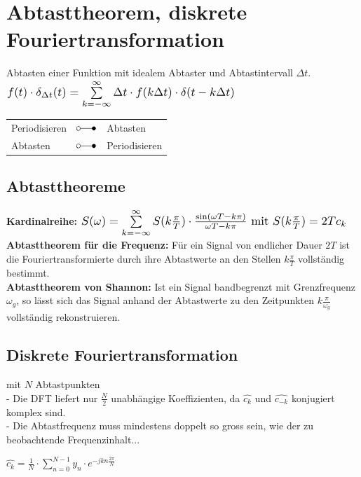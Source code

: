 
\section{Abtasttheorem, diskrete Fouriertransformation}
	\begin{minipage}{12cm}
		Abtasten einer Funktion mit idealem Abtaster und Abtastintervall $\Delta t$.\\
		$ \scalebox{1.2}{$f(t) \cdot \delta_{\Delta t}(t) = \sum\limits_{k=-\infty}^{\infty} \Delta t \cdot f(k \Delta t) \cdot \delta(t-k \Delta t) $}$
	\end{minipage}
	\begin{minipage}{6cm}
		\begin{tabular}{|l l l|}
			\hline
				Periodisieren &$\laplace$ & Abtasten\\
				Abtasten & $\laplace$ & Periodisieren\\
			\hline
		\end{tabular}
	\end{minipage}

\subsection{Abtasttheoreme}
	\textbf{Kardinalreihe:}  $\scalebox{1.2}{$S(\omega) = \sum\limits_{k=-\infty}^{\infty} S(k\frac{\pi}{T}) \cdot \frac{\sin(\omega T - k\pi)}{\omega T - k\pi}$
	mit $S(k\frac{\pi}{T}) = 2Tc_k$}$\\

	\textbf{Abtasttheorem f\"ur die Frequenz:}
	F\"ur ein Signal von endlicher Dauer $2T$ ist die Fouriertransformierte durch ihre Abtastwerte an den Stellen $k\frac{\pi}{T}$
	vollst\"andig bestimmt. \\
	
	\textbf{Abtasttheorem von Shannon:}
	Ist ein Signal bandbegrenzt mit Grenzfrequenz $\omega_g$, so l\"asst sich das Signal anhand der Abtastwerte zu den Zeitpunkten
	$k\frac{\pi}{\omega_g}$ vollst\"andig rekonstruieren.
	
	
\subsection{Diskrete Fouriertransformation}
\begin{minipage}{14cm}
	mit $N$ Abtastpunkten\\
	-	Die DFT liefert nur $\frac{N}{2}$ unabh\"angige Koeffizienten, da $\hat{c_k}$ und $\hat{c_{-k}}$ konjugiert komplex sind.\\
	- Die Abtastfrequenz muss mindestens doppelt so gross sein, wie der zu beobachtende Frequenzinhalt...
\end{minipage}
\hspace{2em}
\begin{minipage}{6cm}
	$\boxed{\hat{c_k} = \frac{1}{N} \cdot \sum\limits_{n=0}^{N-1} y_n \cdot e^{-jkn\frac{2\pi}{N}}}$
\end{minipage}
	
